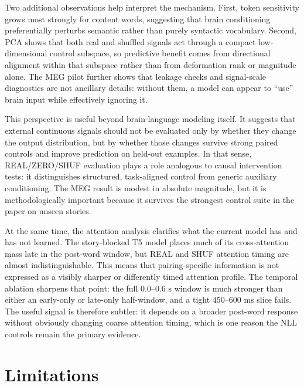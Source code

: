 \documentclass{article}
\theoremstyle{plain}
\theoremstyle{definition}
\theoremstyle{remark}
\begin{document}
Two additional observations help interpret the mechanism.
First, token sensitivity grows most strongly for content words, suggesting that brain conditioning preferentially perturbs semantic rather than purely syntactic vocabulary.
Second, PCA shows that both real and shuffled signals act through a compact low-dimensional control subspace, so predictive benefit comes from directional alignment within that subspace rather than from deformation rank or magnitude alone.
The MEG pilot further shows that leakage checks and signal-scale diagnostics are not ancillary details: without them, a model can appear to ``use'' brain input while effectively ignoring it.

This perspective is useful beyond brain-language modeling itself.
It suggests that external continuous signals should not be evaluated only by whether they change the output distribution, but by whether those changes survive strong paired controls and improve prediction on held-out examples.
In that sense, REAL/ZERO/SHUF evaluation plays a role analogous to causal intervention tests: it distinguishes structured, task-aligned control from generic auxiliary conditioning.
The MEG result is modest in absolute magnitude, but it is methodologically important because it survives the strongest control suite in the paper on unseen stories.

At the same time, the attention analysis clarifies what the current model has and has not learned.
The story-blocked T5 model places much of its cross-attention mass late in the post-word window, but REAL and SHUF attention timing are almost indistinguishable.
This means that pairing-specific information is not expressed as a visibly sharper or differently timed attention profile.
The temporal ablation sharpens that point: the full $0.0$--$0.6$ s window is much stronger than either an early-only or late-only half-window, and a tight $450$--$600$ ms slice fails.
The useful signal is therefore subtler: it depends on a broader post-word response without obviously changing coarse attention timing, which is one reason the NLL controls remain the primary evidence.




\section{Limitations}
\end{document}
